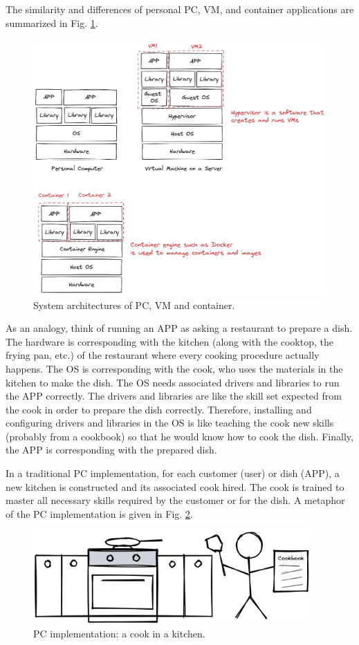 The similarity and differences of personal PC, VM, and container applications are summarized in Fig. \ref{ch:vac:fig:pcvmcontainersructure}.

\begin{figure}
	\centering
	\includegraphics[width=350pt]{chapters/ch-virtualization-and-containerization/figures/pcvmcontainerstructure.png}
	\caption{System architectures of PC, VM and container.} \label{ch:vac:fig:pcvmcontainersructure}
\end{figure}

As an analogy, think of running an APP as asking a restaurant to prepare a dish. The hardware is corresponding with the kitchen (along with the cooktop, the frying pan, etc.) of the restaurant where every cooking procedure actually happens. The OS is corresponding with the cook, who uses the materials in the kitchen to make the dish. The OS needs associated drivers and libraries to run the APP correctly. The drivers and libraries are like the skill set expected from the cook in order to prepare the dish correctly. Therefore, installing and configuring drivers and libraries in the OS is like teaching the cook new skills (probably from a cookbook) so that he would know how to cook the dish. Finally, the APP is corresponding with the prepared dish.

In a traditional PC implementation, for each customer (user) or dish (APP), a new kitchen is constructed and its associated cook hired. The cook is trained to master all necessary skills required by the customer or for the dish. A metaphor of the PC implementation is given in Fig. \ref{ch:vac:fig:acookinakitchen}.
\begin{figure}
	\centering
	\includegraphics[width=300pt]{chapters/ch-virtualization-and-containerization/figures/acookinakitchen.png}
	\caption{PC implementation: a cook in a kitchen.} \label{ch:vac:fig:acookinakitchen}
\end{figure}

